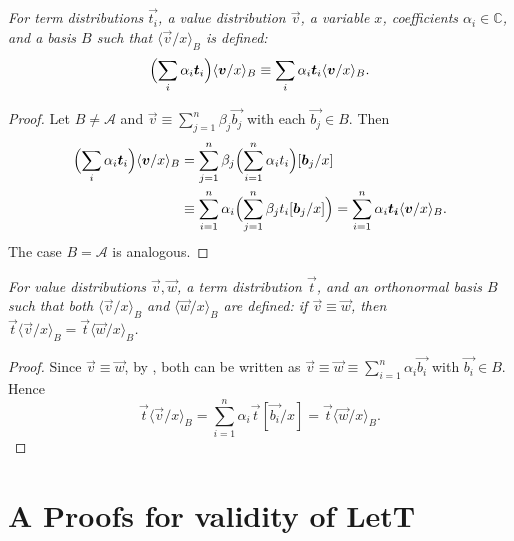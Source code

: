 \documentclass[runningheads,orivec,envcountsame,envcountsect]{llncs}
\newcommand\ansubst[2]{\ensuremath{\langle #1 \rangle_{#2}}}
\newcommand\AbsBasis{\ensuremath{\mathcal{A}}}
\def\C{\mathbb{C}}            %
\begin{document}
\begin{restatelemma}
  \itshape
  For term distributions $\vec{t_i}$, a value distribution $\vec{v}$, a
  variable $x$, coefficients $\alpha_i\in\C$, and a basis $B$ such that
  $\ansubst{\vec v/x}{B}$ is defined:
  \[
    \Bigl(\sum_i \alpha_i\vec t_i\Bigr)\ansubst{\vec v/x}{B}
    \equiv
    \sum_i \alpha_i\vec t_i \ansubst{\vec v/x}{B}.
  \]
\end{restatelemma}
\begin{proof}
  Let $B\neq\AbsBasis$ and
  $\vec{v}\equiv\sum_{j=1}^n\beta_j\vec{b_j}$ with each $\vec{b_j}\in B$.
  Then
  \begin{align*}
    \Bigl(\sum_i \alpha_i\vec t_i\Bigr)\ansubst{\vec v/x}{B}
    &= \sum_{j=1}^n \beta_j\Bigl(\sum_{i=1}^{n}\alpha_i t_i\Bigr)[\vec b_j/x]\\
    &\equiv \sum_{i=1}^{n}\alpha_i\Bigl(\sum_{j=1}^n\beta_j t_i[\vec b_j/x]\Bigr)
    = \sum_{i=1}^{n}\alpha_i\vec{t_i}\ansubst{\vec v/x}{B}.
  \end{align*}
  The case $B=\AbsBasis$ is analogous.
\end{proof}

\begin{restatelemma}
  \itshape
  For value distributions $\vec{v},\vec{w}$, a term distribution $\vec{t}$, and
  an orthonormal basis $B$ such that both
  $\ansubst{\vec{v}/x}{B}$ and $\ansubst{\vec{w}/x}{B}$ are defined:
  if $\vec{v}\equiv\vec{w}$, then
  $\vec{t}\ansubst{\vec{v}/x}{B}
  =\vec{t}\ansubst{\vec{w}/x}{B}$.
\end{restatelemma}
\begin{proof}
  Since $\vec{v}\equiv\vec{w}$, by
  ,
  both can be written as
  $\vec{v}\equiv\vec{w}\equiv\sum_{i=1}^{n}\alpha_i\vec{b_i}$ with
  $\vec{b_i}\in B$. Hence
  \[
    \vec{t}\ansubst{\vec{v}/x}{B}
    = \sum_{i=1}^{n}\alpha_i\vec{t}[\vec{b_i}/x]
    = \vec{t}\ansubst{\vec{w}/x}{B}.
  \]
\end{proof}

\section*{A Proofs for validity of LetT}
{}
\end{document}
